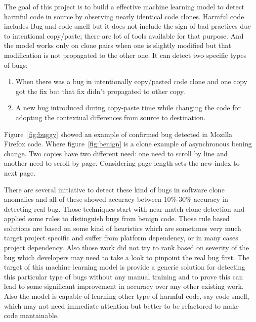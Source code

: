 \documentclass[nocopyrightspace]{sigplanconf}
\begin{document}
\vspace{10 pt}
\noindent
The goal of this project is to build a effective machine learning model to detect harmful code in source by observing nearly identical code clones. Harmful code includes Bug and code smell but it does not include the sign of bad practices due to intentional copy/paste; there are lot of tools available for that purpose. And the model works only on clone pairs when one is slightly modified but that modification is not propagated to the other one. It can detect two specific types of bugs:

\begin{enumerate}
\item When there was a bug in intentionally copy/pasted code clone and one copy got the fix but that fix didn’t propagated to other copy.
\item A new bug introduced during copy-paste time while changing the code for adopting the contextual differences from source to destination.
\end{enumerate}

\vspace{10 pt}
\noindent
Figure~\ref{fig:buggy} showed an example of confirmed bug detected in Mozilla Firefox code. Where figure~\ref{fig:benign} is a clone example of asynchronous bening change. Two copies have two different need: one need to scroll by line and another need to scroll by page. Considering page length sets the new index to next page.


\vspace{10 pt}
\noindent
There are several initiative to detect these kind of bugs in software clone anomalies and all of these showed accuracy between 10\%-30\% accuracy in detecting real bug. Those techniques \cite{Baxter1998,Engler2001,Li2006,Jiang2007,Gabel2010} start with near match clone detection and applied some rules to distinguish bugs from benign code. Those rule based solutions are based on some kind of heuristics which are sometimes very much target project specific and suffer from platform dependency, or in many cases project dependency. Also those work did not try to rank based on severity of the bug which developers may need to take a look to pinpoint the real bug first. The target of this machine learning model is provide a generic solution for detecting this particular type of bugs without any manual training and to prove this can lead to some significant improvement in accuracy over any other existing work. Also the model is capable of learning other type of harmful code, say code smell, which may not need immediate attention but better to be refactored to make code mantainable.
\end{document}
